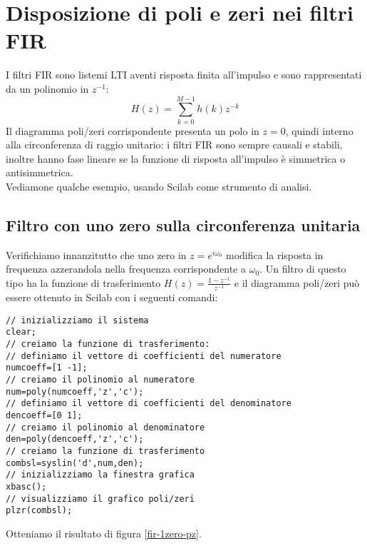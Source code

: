                                                                            
%

\chapter{Disposizione di poli e zeri nei filtri FIR}
I filtri FIR sono listemi LTI aventi risposta finita all'impulso e sono rappresentati da un polinomio in $z^{-1}$:
\begin{displaymath}
H(z)=\sum_{k=0}^{M-1}h(k)z^{-k}
\end{displaymath}
Il diagramma poli/zeri corrispondente presenta un polo in $z=0$, quindi interno alla circonferenza di raggio unitario: i filtri FIR sono sempre causali e stabili, inoltre hanno fase lineare se la funzione di risposta all'impulso \`e simmetrica o antisimmetrica.\\
Vediamone qualche esempio, usando Scilab come strumento di analisi.

\section{Filtro con uno zero sulla circonferenza unitaria}
Verifichiamo innanzitutto che uno zero in $z=e^{i\omega_0}$ modifica la risposta in frequenza azzerandola nella frequenza corrispondente a $\omega_0$.
Un filtro di questo tipo ha la funzione di trasferimento $H(z)=\frac{1-z^{-1}}{z^{-1}}$ e il diagramma poli/zeri pu\`o essere ottenuto in Scilab con i seguenti comandi:
\begin{verbatim}
// inizializziamo il sistema
clear;
// creiamo la funzione di trasferimento:
// definiamo il vettore di coefficienti del numeratore
numcoeff=[1 -1];
// creiamo il polinomio al numeratore
num=poly(numcoeff,'z','c');
// definiamo il vettore di coefficienti del denominatore
dencoeff=[0 1];
// creiamo il polinomio al denominatore
den=poly(dencoeff,'z','c');
// creiamo la funzione di trasferimento
combsl=syslin('d',num,den);
// inizializziamo la finestra grafica
xbasc();
// visualizziamo il grafico poli/zeri
plzr(combsl);
\end{verbatim}
Otteniamo il risultato di figura \ref{fir-1zero-pz}.


